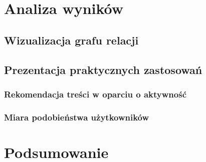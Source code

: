 \chapter{Analiza wyników}
\section{Wizualizacja grafu relacji}
\section{Prezentacja praktycznych zastosowań}
\subsection*{Rekomendacja treści w oparciu o aktywność}
\subsection*{Miara podobieństwa użytkowników}

\chapter{Podsumowanie}
